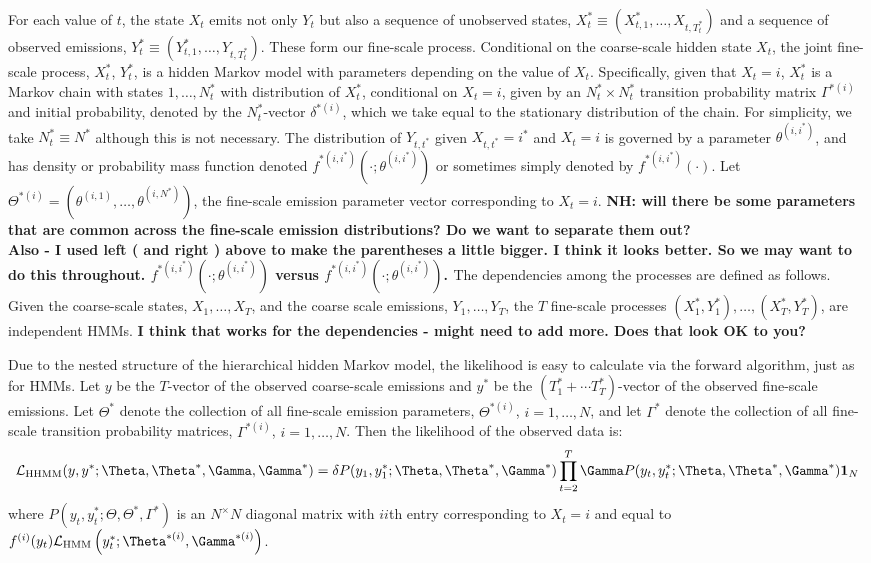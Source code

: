 For each value of $t$, the state $X_t$ emits not only $Y_t$ but also  a sequence of unobserved states, 
$X_t^* \equiv (X_{t,1}^*,\ldots, X_{t,T_t^*})$ and a sequence of observed emissions, 
$Y_t^* \equiv (Y_{t,1}^*,\ldots, Y_{t,T_t^*})$. 
These form our fine-scale process.
Conditional on the coarse-scale hidden state $X_t$, the joint fine-scale process,  $X_t^*$, $Y_t^*$, is a hidden Markov model with parameters depending on the value of $X_t$.  Specifically, given that $X_t=i$,   $X_t^*$ is a Markov chain with states $1,\ldots, N_t^*$ with 
%
\hfill{}
\hfill\break
%
 distribution of $X_t^*$, conditional on $X_t=i$,  given by an $N^*_t \times N^*_t$ transition probability matrix $\Gamma^{*(i)}$ and initial probability, denoted by the $N_t^*$-vector $\delta^{*(i)}$, which we take equal to the stationary distribution of the chain.     For simplicity, we  take $N_t^* \equiv N^*$ although this is not necessary.
%
The distribution of $Y_{t, t^*}$
given $X_{t, t^*}=i^*$ and $X_t=i$ is governed by a parameter  $\theta^{(i,i^*)}$, and has density or probability mass function denoted $f^{*(i,i^*)}\left(\cdot; \theta^{(i,i^*)}\right)$ or sometimes simply denoted by $f^{*(i,i^*)}(\cdot)$.
Let $\Theta^{*(i)}=\left(\theta^{(i,1)}, \ldots, \theta^{(i,N^*)}\right)$, the fine-scale emission parameter vector corresponding to $X_t=i$.
%
\hfill\break
{\bf{NH:  will there be some parameters that are common across the fine-scale emission distributions? Do we want to separate them out?\\
Also - I used left ( and right ) above to make the parentheses a little bigger.  I think it looks better.  So we may want to do this throughout.
$f^{*(i,i^*)}\left(\cdot; \theta^{(i,i^*)}\right)$ versus
$f^{*(i,i^*)}(\cdot; \theta^{(i,i^*)})$.
}}
\hfill\break
%
The dependencies among the processes are defined as follows.
%
Given the coarse-scale states, $X_1,\ldots, X_T$, and the coarse scale emissions,  
$Y_1,\ldots, Y_T$, the $T$ fine-scale processes $(X_1^*, Y_1^*), \ldots, (X_T^*, Y_T^*)$, are independent HMMs.  
\hfill\break
{\bf{I think that works for the dependencies - might need to add more. Does that look OK to you?}}

Due to the nested structure of the hierarchical hidden Markov model, the likelihood  is easy to calculate via the forward algorithm, just as for HMMs.
%
Let $y$ be the $T$-vector of the observed coarse-scale emissions and
$y^*$ be the $(T_1^* + \cdots T_T^*)$-vector of the observed fine-scale emissions.
%
Let $\Theta^*$ denote the collection of all fine-scale emission parameters,
$\Theta^{*(i)}$, $i=1,\ldots, N$, and let $\Gamma^*$ denote the collection of all fine-scale transition probability matrices, $\Gamma^{*(i)}$, $i=1,\ldots, N$.
%
Then the likelihood of the observed data is:
%
\[
\calL_{\text{HHMM}}(y,y^*;\Theta,\Theta^*,\Gamma,\Gamma^*) = \delta P(y_1,y_1^*;\Theta,\Theta^*,\Gamma^*) \prod_{t=2}^T \Gamma P(y_t,y_t^*;\Theta,\Theta^*,\Gamma^*) \mathbf{1}_N
\]
%
where 	$P(y_t,y_t^*;\Theta,\Theta^*,\Gamma^*)$ is an $N^ \times N$ diagonal matrix with $ii$th entry corresponding to $X_t=i$ and equal to 
$f^{(i)}(y_t)\calL_{\text{HMM}}\left(y_t^*;\Theta^{*(i)},
\Gamma^{*(i)}\right)$. 

